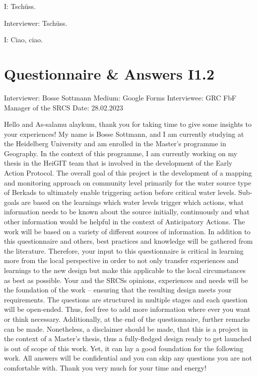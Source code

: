 I: Tschüss. 

Interviewer: Tschüss. 

I: Ciao, ciao. 


\section{Questionnaire  \& Answers I1.2}
Interviewer: Bosse Sottmann\newline
Medium: Google Forms\newline
Interviewee: GRC FbF Manager of the SRCS \newline
Date: 28.02.2023\newline

Hello and As-salamu alaykum,\newline
thank you for taking time to give some insights to your experiences!\newline
My name is Bosse Sottmann, and I am currently studying at the Heidelberg University and am enrolled in the Master's programme in Geography. In the context of this programme, I am currently working on my thesis in the HeiGIT team that is involved in the development of the Early Action Protocol.\newline
The overall goal of this project is the development of a mapping and monitoring approach on community level primarily for the water source type of Berkads to ultimately enable triggering action before critical water levels. Sub-goals are based on the learnings which water levels trigger which actions, what information needs to be known about the source initially, continuously and what other information would be helpful in the context of Anticipatory Actions.\newline
The work will be based on a variety of different sources of information. In addition to this questionnaire and others, best practices and knowledge will be gathered from the literature. Therefore, your input to this questionnaire is critical in learning more from the local perspective in order to not only transfer experiences and learnings to the new design but make this applicable to the local circumstances as best as possible. Your and the SRCSs opinions, experiences and needs will be the foundation of the work – ensuring that the resulting design meets your requirements.\newline
The questions are structured in multiple stages and each question will be open-ended. Thus, feel free to add more information where ever you want or think necessary. Additionally, at the end of the questionnaire, further remarks can be made.\newline
Nonetheless, a disclaimer should be made, that this is a project in the context of a Master's thesis, thus a fully-fledged design ready to get launched is out of scope of this work. Yet, it can lay a good foundation for the following work.\newline
All answers will be confidential and you can skip any questions you are not comfortable with.\newline
Thank you very much for your time and energy!


